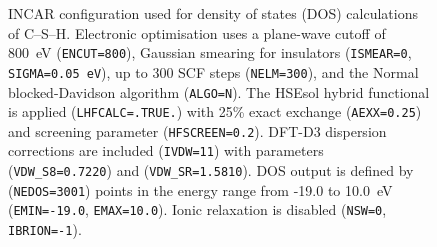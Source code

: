 \begin{figure}[H]  
    \centering  
    \begin{threeparttable}  
        \caption{INCAR configuration used for density of states (DOS) calculations of C--S--H. Electronic optimisation uses a plane-wave cutoff of 800~eV (\texttt{ENCUT=800}), Gaussian smearing for insulators (\texttt{ISMEAR=0}, \texttt{SIGMA=0.05~eV}), up to 300 SCF steps (\texttt{NELM=300}), and the Normal blocked-Davidson algorithm (\texttt{ALGO=N}). The HSEsol hybrid functional is applied (\texttt{LHFCALC=.TRUE.}) with 25\% exact exchange (\texttt{AEXX=0.25}) and screening parameter (\texttt{HFSCREEN=0.2}). DFT-D3 dispersion corrections are included (\texttt{IVDW=11}) with parameters (\texttt{VDW\_S8=0.7220}) and (\texttt{VDW\_SR=1.5810}). DOS output is defined by (\texttt{NEDOS=3001}) points in the energy range from -19.0 to 10.0~eV (\texttt{EMIN=-19.0}, \texttt{EMAX=10.0}). Ionic relaxation is disabled (\texttt{NSW=0}, \texttt{IBRION=-1}).}
        \label{fig:incar_dos}  
\end{threeparttable}
\end{figure}
